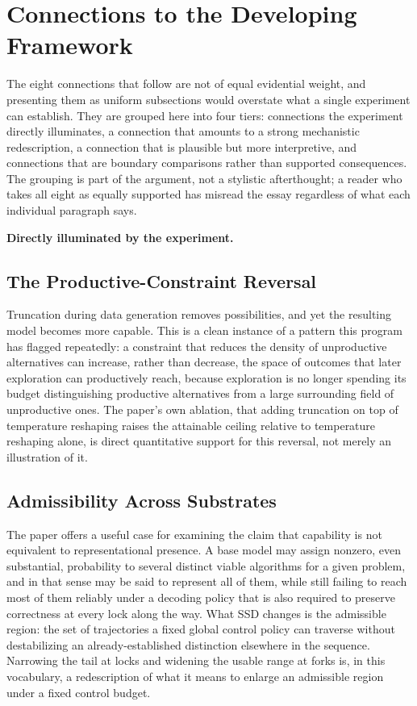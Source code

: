 \documentclass[11pt]{article}
\begin{document}
\section{Connections to the Developing Framework}

The eight connections that follow are not of equal evidential weight, and presenting them as uniform subsections would overstate what a single experiment can establish. They are grouped here into four tiers: connections the experiment directly illuminates, a connection that amounts to a strong mechanistic redescription, a connection that is plausible but more interpretive, and connections that are boundary comparisons rather than supported consequences. The grouping is part of the argument, not a stylistic afterthought; a reader who takes all eight as equally supported has misread the essay regardless of what each individual paragraph says.

\textbf{Directly illuminated by the experiment.}

\subsection{The Productive-Constraint Reversal}

Truncation during data generation removes possibilities, and yet the resulting model becomes more capable. This is a clean instance of a pattern this program has flagged repeatedly: a constraint that reduces the density of unproductive alternatives can increase, rather than decrease, the space of outcomes that later exploration can productively reach, because exploration is no longer spending its budget distinguishing productive alternatives from a large surrounding field of unproductive ones. The paper's own ablation, that adding truncation on top of temperature reshaping raises the attainable ceiling relative to temperature reshaping alone, is direct quantitative support for this reversal, not merely an illustration of it.

\subsection{Admissibility Across Substrates}

The paper offers a useful case for examining the claim that capability is not equivalent to representational presence. A base model may assign nonzero, even substantial, probability to several distinct viable algorithms for a given problem, and in that sense may be said to represent all of them, while still failing to reach most of them reliably under a decoding policy that is also required to preserve correctness at every lock along the way. What SSD changes is the admissible region: the set of trajectories a fixed global control policy can traverse without destabilizing an already-established distinction elsewhere in the sequence. Narrowing the tail at locks and widening the usable range at forks is, in this vocabulary, a redescription of what it means to enlarge an admissible region under a fixed control budget.
\end{document}
